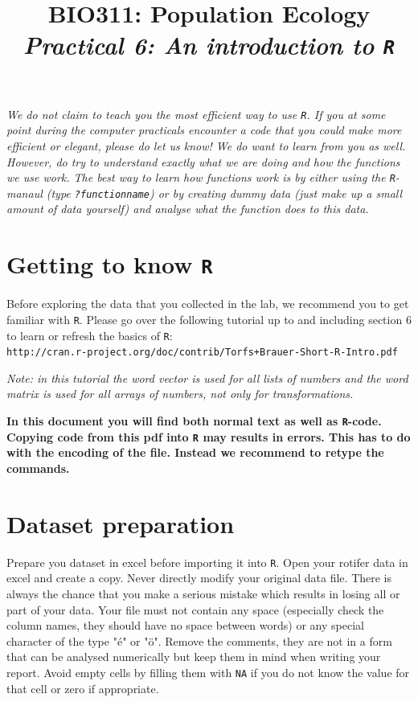 \documentclass[12pt,a4paper]{article}\usepackage[]{graphicx}\usepackage[]{color}
\title{BIO311: Population Ecology\\ \textit{Practical 6: An introduction to \texttt{R}}}
\begin{document}



\maketitle
\tableofcontents
\vspace{3cm}
\begin{mdframed}
\textit{We do not claim to teach you the most efficient way to use \texttt{R}. If you at some point during the computer practicals encounter a code that you could make more efficient or elegant, please do let us know! We do want to learn from you as well.\\[1.5ex] However, do try to understand exactly what we are doing and how the functions we use work. The best way to learn how functions work is by either using the \texttt{R}-manaul (type \texttt{?functionname}) or by creating dummy data (just make up a small amount of data yourself) and analyse what the function does to this data.}
\end{mdframed}
\newpage
\section{Getting to know \texttt{R}}
Before exploring the data that you collected in the lab, we recommend you to get familiar with \texttt{R}. Please go over the following tutorial up to and including section 6 to learn or refresh the basics of \texttt{R}:\\

\texttt{http://cran.r-project.org/doc/contrib/Torfs+Brauer-Short-R-Intro.pdf}
\vspace{1.5ex}

\textit{Note: in this tutorial the word vector is used for all lists of numbers and the word matrix is used for all arrays of numbers, not only for transformations.}

\begin{mdframed}[backgroundcolor=red!40]
\textbf{In this document you will find both normal text as well as \texttt{R}-code. Copying code from this pdf into \texttt{R} may results in errors. This has to do with the encoding of the file. Instead we recommend to retype the commands.}
\end{mdframed}

\section{Dataset preparation}
Prepare you dataset in excel before importing it into \texttt{R}. Open your rotifer data in excel and create a copy. Never directly modify your original data file. There is always the chance that you make a serious mistake which results in losing all or part of your data. Your file must not contain any space (especially check the column names, they should have no space between words) or any special character of the type "\'e" or "\"o". Remove the comments, they are not in a form that can be analysed numerically but keep them in mind when writing your report. Avoid empty cells by filling them with \texttt{NA} if you do not know the value for that cell or zero if appropriate. 
\end{document}
